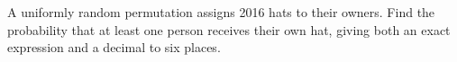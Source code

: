 A uniformly random permutation assigns 2016 hats to their owners. Find the probability that at least one person receives their own hat, giving both an exact expression and a decimal to six places.
